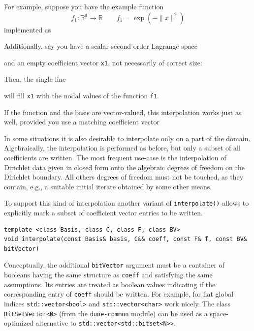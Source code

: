 \documentclass[a4paper,10pt,headings=normal,bibliography=totoc]{scrartcl}
\newcommand{\cpp}[1]{\lstinline[basicstyle=\ttfamily]!#1!}
\newcommand{\R}{\mathbb{R}}
\newcommand{\norm}[1]{\lVert#1\rVert}
\newcommand{\dunemodule}[1]{\texttt{#1}}
\newcommand{\todograeser}[1]{\todo[inline,color=lightblue,author=CG]{#1}}
\begin{document}
For example, suppose you have the example function
\begin{equation*}
 f_1 : \R^d \to \R
 \qquad
 f_1 =  \exp(-\norm{x}^2)
\end{equation*}
implemented as
\todograeser{Update example code}
%

%
Additionally, say you have a scalar second-order Lagrange space
%

%
and an empty coefficient vector \cpp{x1}, not necessarily of correct size:
%

%
Then, the single line
%

%
will fill \cpp{x1} with the nodal values of the function \cpp{f1}.

If the function and the basis are vector-valued, this interpolation works just as well, provided you use
a matching coefficient vector
%

%

In some situations it is also desirable to interpolate only on a part of the domain.  Algebraically, the interpolation
is performed as before, but only a subset of all coefficients are written.  The most frequent use-case is the interpolation
of Dirichlet data given in closed form onto the algebraic degrees of freedom on the Dirichlet boundary.  All others
degrees of freedom must not be touched, as they contain, e.g., a suitable initial iterate obtained by some other
means.

To support this kind of interpolation another variant of
\cpp{interpolate()} allows to explicitly mark a subset of
coefficient vector entries to be written.
\begin{lstlisting}[style=Interface]
template <class Basis, class C, class F, class BV>
void interpolate(const Basis& basis, C&& coeff, const F& f, const BV& bitVector)
\end{lstlisting}
Conceptually, the additional \cpp{bitVector}
argument must be a container of booleans having
the same structure as \cpp{coeff} and satisfying
the same assumptions.  Its entries are treated as boolean
values indicating if the corresponding entry of \cpp{coeff}
should be written.
For example, for flat global indices \cpp{std::vector<bool>} and
\cpp{std::vector<char>} work nicely.
The class \cpp{BitSetVector<N>} (from the \dunemodule{dune-common} module) can be used
as a space-optimized alternative to \cpp{std::vector<std::bitset<N>>}.
\end{document}
